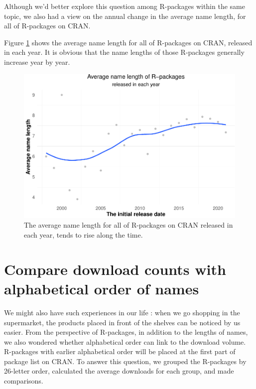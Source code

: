 \documentclass[
]{book}
\begin{document}
Although we'd better explore this question among R-packages within the same topic, we also had a view on the annual change in the average name length, for all of R-packages on CRAN.

Figure \ref{fig:avgnamelth-year} shows the average name length for all of R-packages on CRAN, released in each year. It is obvious that the name lengths of those R-packages generally increase year by year.



\begin{figure}

{\centering \includegraphics{figures/avgnamelth-year-1} 

}

\caption{The average name length for all of R-packages on CRAN released in each year, tends to rise along the time.}\label{fig:avgnamelth-year}
\end{figure}

\hypertarget{compare-download-counts-with-alphabetical-order-of-names}{%
\section{Compare download counts with alphabetical order of names}\label{compare-download-counts-with-alphabetical-order-of-names}}

We might also have such experiences in our life : when we go shopping in the supermarket, the products placed in front of the shelves can be noticed by us easier. From the perspective of R-packages, in addition to the lengths of names, we also wondered whether alphabetical order can link to the download volume. R-packages with earlier alphabetical order will be placed at the first part of package list on CRAN\citep{cranpkgsname}. To answer this question, we grouped the R-packages by 26-letter order, calculated the average downloads for each group, and made comparisons.
\end{document}
